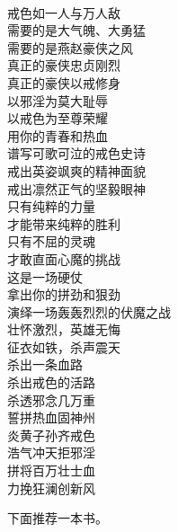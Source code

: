 \begin{poem}[杀出重围]
    \begin{multicols}{3}
        \centering~\\
        戒色如一人与万人敌 \\ 需要的是大气魄、大勇猛 \\ 需要的是燕赵豪侠之风 \\ 真正的豪侠忠贞刚烈 \\ 真正的豪侠以戒修身 \\ 以邪淫为莫大耻辱 \\ 以戒色为至尊荣耀 \\ 用你的青春和热血 \\ 谱写可歌可泣的戒色史诗 \\ 戒出英姿飒爽的精神面貌 \\ 戒出凛然正气的坚毅眼神 \\ 只有纯粹的力量 \\ 才能带来纯粹的胜利 \\ 只有不屈的灵魂 \\ 才敢直面心魔的挑战 \\ 这是一场硬仗 \\ 拿出你的拼劲和狠劲 \\ 演绎一场轰轰烈烈的伏魔之战 \\ 壮怀激烈，英雄无悔 \\ 征衣如铁，杀声震天 \\ 杀出一条血路 \\ 杀出戒色的活路 \\ 杀透邪念几万重 \\ 誓拼热血固神州 \\ 炎黄子孙齐戒色 \\ 浩气冲天拒邪淫 \\ 拼将百万壮士血 \\ 力挽狂澜创新风
    \end{multicols}
\end{poem}

下面推荐一本书。

